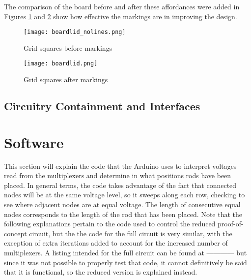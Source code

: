 The comparison of the board before and after these affordances were added in Figures \ref{fig:boardlid_nolines} and \ref{fig:boardlid}  show how effective the markings are in improving the design.


\begin{figure}[H]
	\begin{center}
	\texttt{[image: boardlid\_nolines.png]}\\ 
  	\caption{Grid squares before markings}
    \label{fig:boardlid_nolines}
    \end{center}
\end{figure}

\begin{figure}[H]
	\begin{center}
	\texttt{[image: boardlid.png]}\\ 
  	\caption{Grid squares after markings}
    \label{fig:boardlid}
    \end{center}
\end{figure}




\subsection{Circuitry Containment and Interfaces}

\section{Software}
\label{sec:software}


This section will explain the code that the Arduino uses to interpret voltages read from the multiplexers and determine in what positions rods have been placed. In general terms, the code takes advantage of the fact that connected nodes will be at the same voltage level, so it sweeps along each row, checking to see where adjacent nodes are at equal voltage. The length of consecutive equal nodes corresponds to the length of the rod that has been placed. Note that the following explanations pertain to the code used to control the reduced proof-of-concept circuit, but the the code for the full circuit is very similar, with the exception of extra iterations added to account for the increased number of multiplexers. A listing intended for the full circuit can be found at ------------ but since it was not possible to properly test that code, it cannot definitively be said that it is functional, so the reduced version is explained instead.


